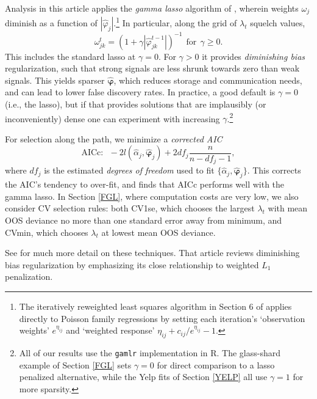 \documentclass[12pt]{article}
\newcommand{\bs}[1]{\boldsymbol{#1}}
\begin{document}
Analysis in this article applies the {\it gamma lasso} algorithm  of
\citet{taddy_one-step_2014}, wherein weights $\omega_j$ diminish as a
function of $|\hat\varphi_j|$.\footnote{The iteratively reweighted least
squares algorithm in Section 6 of \citet{taddy_one-step_2014} applies directly to Poisson
family regressions by setting each iteration's `observation weights' $e^{\eta_{ij}}$ and
`weighted response' $\eta_{ij} + c_{ij}/e^{\eta_{ij}} - 1$.}  In particular,
along the grid of $\lambda_t$ squelch values,
\begin{equation}\label{glweight}
\omega^{t}_{jk}  = \left(1 + \gamma
|\hat\varphi^{t-1}_{jk}|\right)^{-1} ~~\text{for}~~\gamma \geq 0.
\end{equation} 
This includes the standard lasso at $\gamma=0$.  For $\gamma>0$ it provides
{\it diminishing bias} regularization, such that strong signals are less
shrunk towards zero than  weak signals. This yields
sparser $\bs{\hat
\varphi}$, which reduces storage and communication needs, and can
 lead to lower false discovery rates.  In practice, a good default is
$\gamma=0$ (i.e., the lasso), but if that provides solutions that are implausibly (or inconveniently) dense one can experiment with increasing $\gamma$.\footnote{All of our
results use the {\tt gamlr} implementation in R.  The glass-shard example of
Section \ref{FGL} sets $\gamma=0$ for direct comparison to a lasso penalized
alternative, while the Yelp fits of Section \ref{YELP} all use $\gamma=1$ for
more sparsity.}

For selection along the path, we
minimize a {\it corrected AIC} \citep{hurvich_regression_1989}
\begin{equation}
\text{AICc:}~~~-2l(\hat\alpha_j,\bs{\hat\varphi}_j) + 2df_j\frac{n}{n-df_j-1},
\end{equation}
where $df_j$ is the estimated {\it degrees of freedom} used to fit
$\{\hat\alpha_j,\bs{\hat\varphi}_j\}$.  This corrects the AIC's tendency to
over-fit, and \cite{taddy_one-step_2014} finds that AICc performs well with the gamma lasso.   In Section
\ref{FGL}, where computation costs are very low, we also consider CV selection
rules: both CV1se, which chooses the largest $\lambda_t$ with mean OOS
deviance no more than one standard error away from  minimum, and CVmin,
which chooses $\lambda_t$ at lowest mean OOS deviance.

See \cite{taddy_one-step_2014} for much more detail on these techniques. That article reviews
diminishing bias  regularization by emphasizing its close relationship
to  weighted $L_1$ penalization.  
\end{document}
